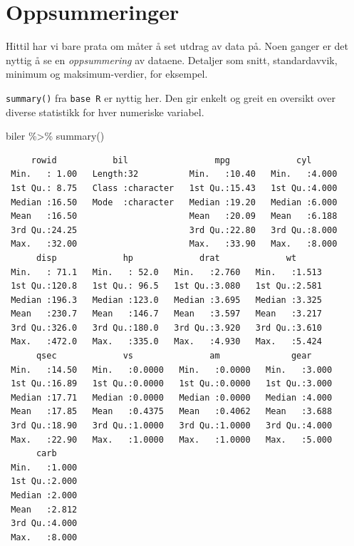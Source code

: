 \documentclass[
  letterpaper,
  DIV=11,
  numbers=noendperiod]{scrreprt}
\newenvironment{Shaded}{\begin{snugshade}}{\end{snugshade}}
\newcommand{\FunctionTok}[1]{\textcolor[rgb]{0.28,0.35,0.67}{#1}}
\newcommand{\NormalTok}[1]{\textcolor[rgb]{0.00,0.23,0.31}{#1}}
\newcommand{\SpecialCharTok}[1]{\textcolor[rgb]{0.37,0.37,0.37}{#1}}
\begin{document}
\hypertarget{sec-oppsummering}{%
\section{Oppsummeringer}\label{sec-oppsummering}}

Hittil har vi bare prata om måter å set utdrag av data på. Noen ganger
er det nyttig å se en \emph{oppsummering} av dataene. Detaljer som
snitt, standardavvik, minimum og maksimum-verdier, for eksempel.

\texttt{summary()} fra \texttt{base\ R} er nyttig her. Den gir enkelt og
greit en oversikt over diverse statistikk for hver numeriske variabel.

\begin{Shaded}
\begin{Highlighting}[]
\NormalTok{biler }\SpecialCharTok{\%\textgreater{}\%} \FunctionTok{summary}\NormalTok{()}
\end{Highlighting}
\end{Shaded}

\begin{verbatim}
     rowid           bil                 mpg             cyl       
 Min.   : 1.00   Length:32          Min.   :10.40   Min.   :4.000  
 1st Qu.: 8.75   Class :character   1st Qu.:15.43   1st Qu.:4.000  
 Median :16.50   Mode  :character   Median :19.20   Median :6.000  
 Mean   :16.50                      Mean   :20.09   Mean   :6.188  
 3rd Qu.:24.25                      3rd Qu.:22.80   3rd Qu.:8.000  
 Max.   :32.00                      Max.   :33.90   Max.   :8.000  
      disp             hp             drat             wt       
 Min.   : 71.1   Min.   : 52.0   Min.   :2.760   Min.   :1.513  
 1st Qu.:120.8   1st Qu.: 96.5   1st Qu.:3.080   1st Qu.:2.581  
 Median :196.3   Median :123.0   Median :3.695   Median :3.325  
 Mean   :230.7   Mean   :146.7   Mean   :3.597   Mean   :3.217  
 3rd Qu.:326.0   3rd Qu.:180.0   3rd Qu.:3.920   3rd Qu.:3.610  
 Max.   :472.0   Max.   :335.0   Max.   :4.930   Max.   :5.424  
      qsec             vs               am              gear      
 Min.   :14.50   Min.   :0.0000   Min.   :0.0000   Min.   :3.000  
 1st Qu.:16.89   1st Qu.:0.0000   1st Qu.:0.0000   1st Qu.:3.000  
 Median :17.71   Median :0.0000   Median :0.0000   Median :4.000  
 Mean   :17.85   Mean   :0.4375   Mean   :0.4062   Mean   :3.688  
 3rd Qu.:18.90   3rd Qu.:1.0000   3rd Qu.:1.0000   3rd Qu.:4.000  
 Max.   :22.90   Max.   :1.0000   Max.   :1.0000   Max.   :5.000  
      carb      
 Min.   :1.000  
 1st Qu.:2.000  
 Median :2.000  
 Mean   :2.812  
 3rd Qu.:4.000  
 Max.   :8.000  
\end{verbatim}
\end{document}
